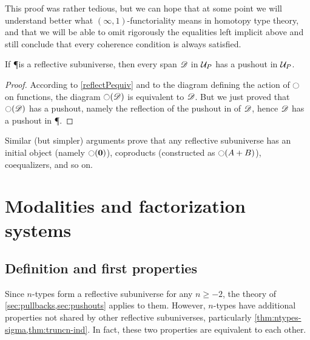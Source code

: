 This proof was rather tedious, but we can hope that at some point we will
understand better what $(\infty,1)$-functoriality means in homotopy type theory, and
that we will be able to omit rigorously the equalities left implicit above and still
conclude that every coherence condition is always satisfied.

\begin{cor}
  If \P is a reflective subuniverse, then
  every span $\Ddiag$ in $\P$ has a pushout in $\P$.
\end{cor}

\begin{proof}
  According to \autoref{reflectPequiv} and to the diagram defining the action of
  $\reflect$ on functions, the diagram $\reflect(\Ddiag)$ is equivalent to
  $\Ddiag$. But we just proved that $\reflect(\Ddiag)$ has a pushout, namely the
  reflection of the pushout in \type of $\Ddiag$, hence $\Ddiag$ has a pushout
  in \P.
\end{proof}

Similar (but simpler) arguments prove that any reflective subuniverse has an initial object (namely $\reflect(\emptyt)$), coproducts
(constructed as $\reflect(A+B)$), coequalizers, and so on.


\section{Modalities and factorization systems}
\label{sec:modalities}

\subsection{Definition and first properties}
\label{subsec:modal-defn}

Since $n$-types form a reflective subuniverse for any $n\ge -2$, the theory of \autoref{sec:pullbacks,sec:pushouts} applies to them.
However, $n$-types have additional properties not shared by other reflective subuniverses, particularly \autoref{thm:ntypes-sigma,thm:truncn-ind}.
In fact, these two properties are equivalent to each other.

